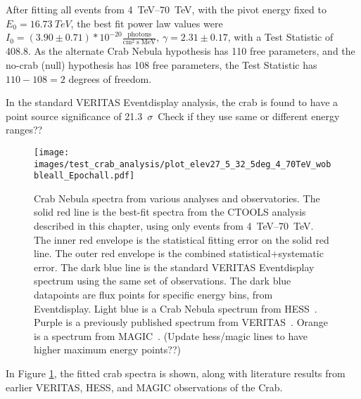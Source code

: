     After fitting all events from \SIrange{4}{70}{TeV}, with the pivot energy fixed to $ E_{0}= \SI{16.73}{TeV} $, the best fit power law values were $ I_{0} = \left(3.90\pm0.71\right)*10^{-20} \frac{\textrm{photons}}{\textrm{cm}^{2} \; \textrm{s} \; \textrm{MeV} } $, $ \gamma = 2.31 \pm 0.17 $, with a Test Statistic of 408.8.
    As the alternate Crab Nebula hypothesis has 110 free parameters, and the no-crab (null) hypothesis has 108 free parameters, the Test Statistic has $ 110 - 108 = 2 $ degrees of freedom.
    
    In the standard VERITAS Eventdisplay analysis, the crab is found to have a point source significance of \SI{21.3}{$\sigma$}.
    {\color{red}Check if they use same or different energy ranges??}
    
    
    \begin{figure}[h]
      \centering
      \texttt{[image: images/test\_crab\_analysis/plot\_elev27\_5\_32\_5deg\_4\_70TeV\_wobbleall\_Epochall.pdf]}
      \caption[Crab Test Spectrum]
      {
        Crab Nebula spectra from various analyses and observatories.
        The solid red line is the best-fit spectra from the CTOOLS analysis described in this chapter, using only events from \SIrange{4}{70}{TeV}.
        The inner red envelope is the statistical fitting error on the solid red line.
        The outer red envelope is the combined statistical+systematic error.
        The dark blue line is the standard VERITAS Eventdisplay spectrum using the same set of observations.
        The dark blue datapoints are flux points for specific energy bins, from Eventdisplay.
        Light blue is a Crab Nebula spectrum from HESS~\cite{hess2006crab}.
        Purple is a previously published spectrum from VERITAS~\cite{veritas2015crab}.
        Orange is a spectrum from MAGIC~\cite{magic2015crab}.
        {\color{red}(Update hess/magic lines to have higher maximum energy points??)}
      }
      \label{fig:crab_test_spectra}
    \end{figure}
    
    In Figure \ref{fig:crab_test_spectra}, the fitted crab spectra is shown, along with literature results from earlier VERITAS, HESS, and MAGIC observations of the Crab.
    
